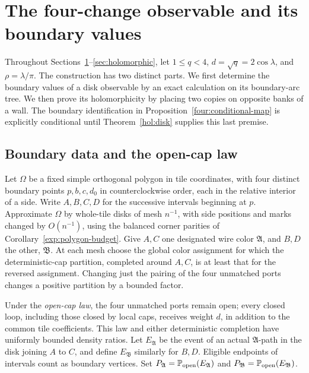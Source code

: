 \section{The four-change observable and its boundary values}
\label{sec:fourchange}

Throughout Sections~\ref{sec:fourchange}--\ref{sec:holomorphic}, let
$1\le q<4$, $d=\sqrt q=2\cos\lambda$, and $\rho=\lambda/\pi$.
The construction has two distinct parts.  We first determine the boundary
values of a disk observable by an exact calculation on its boundary-arc
tree.  We then prove its holomorphicity by placing two copies on opposite
banks of a wall.  The boundary identification in
Proposition~\ref{four:conditional-map} is explicitly conditional until
Theorem~\ref{hol:disk} supplies this last premise.

\subsection{Boundary data and the open-cap law}

Let $\Omega$ be a fixed simple orthogonal polygon in tile coordinates,
with four distinct boundary points $p,b,c,d_0$ in counterclockwise order,
each in the relative interior of a side.  Write $A,B,C,D$ for the successive
intervals beginning at $p$.  Approximate $\Omega$ by whole-tile disks of
mesh $n^{-1}$, with side positions and marks changed by $O(n^{-1})$,
using the balanced corner parities of Corollary~\ref{exp:polygon-budget}.
Give $A,C$ one designated wire color $\mathfrak A$, and $B,D$ the other,
$\mathfrak B$.  At each mesh choose the global color assignment for which
the deterministic-cap partition, completed around $A,C$, is at least
that for the reversed assignment.  Changing just the pairing of the four
unmatched ports changes a positive partition by a bounded factor.

Under the \emph{open-cap law}, the four unmatched ports remain open;
every closed loop, including those closed by local caps, receives weight
$d$, in addition to the common tile coefficients.  This law and either
deterministic completion have uniformly bounded density ratios.  Let
$E_{\mathfrak A}$ be the event of an actual $\mathfrak A$-path in the disk
joining $A$ to $C$, and define $E_{\mathfrak B}$ similarly for $B,D$.
Eligible endpoints of intervals count as boundary vertices.  Set
$P_{\mathfrak A}=\mathbb P_{\rm open}(E_{\mathfrak A})$ and
$P_{\mathfrak B}=\mathbb P_{\rm open}(E_{\mathfrak B})$.

